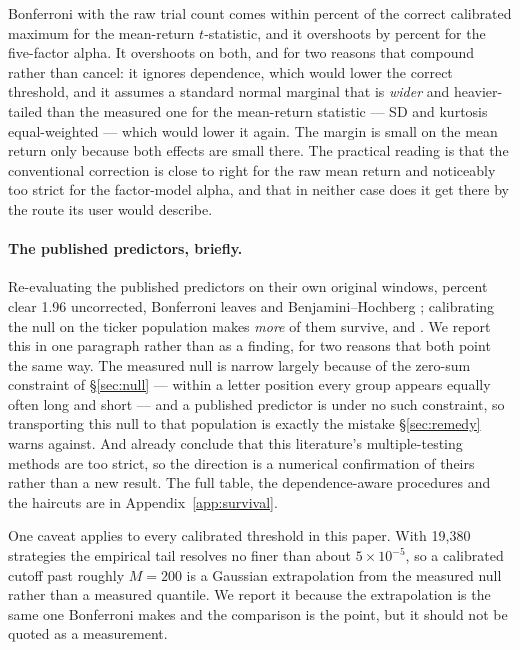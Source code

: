 \documentclass{article}
\begin{document}
Bonferroni with the raw trial count comes within
\bzoobonfErrorMeanEwPct{} percent of the correct calibrated maximum for the
mean-return $t$-statistic, and it overshoots by \bzoobonfErrorFfVwPct{} percent
for the five-factor alpha. It overshoots on both, and for two reasons that
compound rather than cancel: it ignores dependence, which would lower the
correct threshold, and it assumes a standard normal marginal that is
\emph{wider} and heavier-tailed than the measured one for the mean-return
statistic --- SD \bzoonullMeanSdEw{} and kurtosis \bzoonullMeanKurtEw{}
equal-weighted --- which would lower it again. The margin is small on the mean
return only because both effects are small there. The practical reading is that the conventional
correction is close to right for the raw mean return and noticeably too strict
for the factor-model alpha, and that in neither case does it get there by the
route its user would describe.

\paragraph{The published predictors, briefly.}
Re-evaluating the \bzoopublishedN{} published predictors on their own original
windows, \bzoopublishedShareTwoPct{} percent clear 1.96 uncorrected, Bonferroni
leaves \bzoosurvBonfNominal{} and Benjamini--Hochberg \bzoosurvBhNominal{};
calibrating the null on the ticker population makes \emph{more} of them
survive, \bzoosurvBonfCalibrated{} and \bzoosurvBhCalibrated{}. We report this
in one paragraph rather than as a finding, for two reasons that both point the
same way. The measured null is narrow largely because of the zero-sum
constraint of \S\ref{sec:null} --- within a letter position every group appears
equally often long and short --- and a published predictor is under no such
constraint, so transporting this null to that population is exactly the mistake
\S\ref{sec:remedy} warns against. And \citet{chen2025htap} already conclude
that this literature's multiple-testing methods are too strict, so the
direction is a numerical confirmation of theirs rather than a new result. The
full table, the dependence-aware procedures and the
\citet{harvey2015backtesting} haircuts are in
Appendix~\ref{app:survival}.

One caveat applies to every calibrated threshold in this paper. With 19{,}380
strategies the empirical tail resolves no finer than about $5\times 10^{-5}$,
so a calibrated cutoff past roughly $M = 200$ is a Gaussian extrapolation from
the measured null rather than a measured quantile. We report it because the
extrapolation is the same one Bonferroni makes and the comparison is the point,
but it should not be quoted as a measurement.
\end{document}
